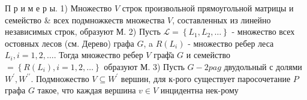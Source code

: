 \documentclass[10pt]{article}
\begin{document}
П р и м е р ы. 1) Множество $V$ строк произвольной прямоугольной матрицы и семейство \& всех подмножкеств множества $V$, составленных из линейно независимых строк, образуют М. 2) Пусть $\mathscr{L}=\left\{L_{1}, L_{2}, \ldots\right\}$ - множество всех остовных лесов (см. Дерево) графа $G$, a $R\left(L_{i}\right)$ - множество ребер леса $L_{i}, i=1,2, \ldots$. Тогда множество ребер $V$ граф̆а $G$ и семейство $=\left\{R\left(L_{i}\right), i=1,2, \ldots\right\}$ образуют М. 3) Пусть $G-2 p a g$ двудольный с долями $W^{\prime}, W^{\prime \prime}$. Подмножество $V \subseteq W^{\prime}$ вершин, для к-рого существует паросочетание $P$ графа $G$ такое, что каждая вершина $v \in V$ инцидентна нек-рому
\end{document}
